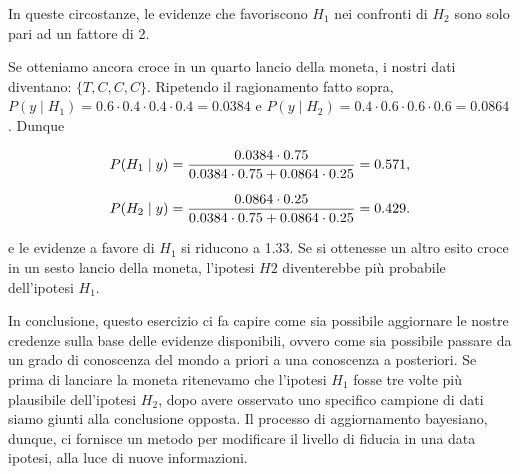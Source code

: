 \documentclass[
  11pt,
]{krantz}
\theoremstyle{definition}
\theoremstyle{definition}
\theoremstyle{definition}
\theoremstyle{definition}
\theoremstyle{remark}
\begin{document}
In queste circostanze, le evidenze che favoriscono \(H_1\) nei confronti di \(H_2\) sono solo pari ad un fattore di 2.

Se otteniamo ancora croce in un quarto lancio della moneta, i nostri dati diventano: \(\{T, C, C, C\}\). Ripetendo il ragionamento fatto sopra, \(P(y \mid H_1) = 0.6 \cdot 0.4 \cdot 0.4 \cdot 0.4 = 0.0384\) e \(P(y \mid H_2) = 0.4 \cdot 0.6 \cdot 0.6 \cdot 0.6 = 0.0864\). Dunque

\begin{equation}
P(H_1 \mid y) = \frac{0.0384 \cdot 0.75}{0.0384 \cdot 0.75 + 0.0864 \cdot 0.25} = 0.571,\notag
\end{equation}

\begin{equation}
P(H_2 \mid y) = \frac{0.0864 \cdot 0.25}{0.0384 \cdot 0.75 + 0.0864 \cdot 0.25} = 0.429.\notag
\end{equation}

e le evidenze a favore di \(H_1\) si riducono a 1.33. Se si ottenesse un altro esito croce in un sesto lancio della moneta, l'ipotesi \(H2\) diventerebbe più probabile dell'ipotesi \(H_1\).

In conclusione, questo esercizio ci fa capire come sia possibile aggiornare le nostre credenze sulla base delle evidenze disponibili, ovvero come sia possibile passare da un grado di conoscenza del mondo a priori a una conoscenza a posteriori. Se prima di lanciare la moneta ritenevamo che l'ipotesi \(H_1\) fosse tre volte più plausibile dell'ipotesi \(H_2\), dopo avere osservato uno specifico campione di dati siamo giunti alla conclusione opposta. Il processo di aggiornamento bayesiano, dunque, ci fornisce un metodo per modificare il livello di fiducia in una data ipotesi, alla luce di nuove informazioni.

  

\printindex
\end{document}
